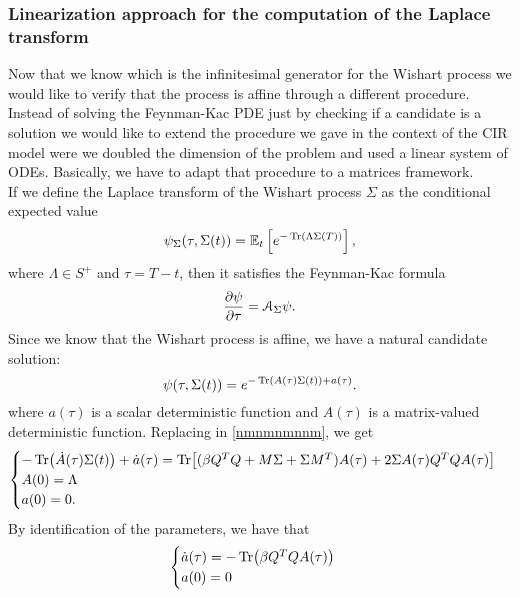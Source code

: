 \subsubsection{Linearization approach for the computation of the Laplace transform}
Now that we know which is the infinitesimal generator for the Wishart process we would like to verify that the process is affine through a different procedure. Instead of solving the Feynman-Kac PDE just by checking if a candidate is a solution we would like to extend the procedure we gave in the context of the CIR model were we doubled the dimension of the problem and used a linear system of ODEs. Basically, we have to adapt that procedure to a matrices framework.\\
If we define the Laplace transform of the Wishart process $\Sigma$ as the conditional expected value
\begin{equation}
    \psi_{\Sigma}(\tau, \Sigma(t)) = \mathbb{E}_t\left[e^{-\Tr(\Lambda\Sigma(T))}\right],
\end{equation}
where $\Lambda\in S^+$ and $\tau = T-t$, then it satisfies the Feynman-Kac formula
\begin{equation}\label{nmnmnmnnm}
    \pdv{\psi}{\tau} = \mathcal{A}_{\Sigma}\psi.
\end{equation}
Since we know that the Wishart process is affine, we have a natural candidate solution:
\begin{equation}
    \psi(\tau, \Sigma(t)) = e^{-\Tr(A(\tau)\Sigma(t))+ a(\tau)}.
\end{equation}
where $a(\tau)$ is a scalar deterministic function and $A(\tau)$ is a matrix-valued deterministic function. Replacing in \eqref{nmnmnmnnm}, we get
\begin{equation*}
    \begin{cases}
    -\Tr(\dot{A}(\tau)\Sigma(t)) + \dot{a}(\tau) = \Tr[(\beta Q^TQ + M\Sigma + \Sigma M^T)A(\tau) + 2\Sigma A(\tau)Q^TQA(\tau)] \\ %
    A(0) = \Lambda \\
    a(0) = 0.
    \end{cases}
\end{equation*}
By identification of the parameters, we have that
\begin{equation*}
    \begin{cases}
        \dot{a}(\tau) = -\Tr(\beta Q^TQ A(\tau)) \\
        a(0) = 0
    \end{cases}
\end{equation*}
